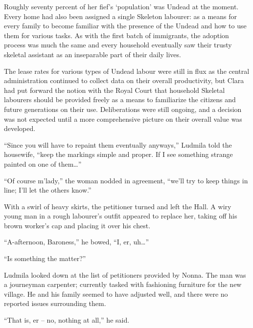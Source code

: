  

Roughly seventy percent of her fief’s ‘population’ was Undead at the moment. Every home had also been assigned a single Skeleton labourer: as a means for every family to become familiar with the presence of the Undead and how to use them for various tasks. As with the first batch of immigrants, the adoption process was much the same and every household eventually saw their trusty skeletal assistant as an inseparable part of their daily lives.

 

The lease rates for various types of Undead labour were still in flux as the central administration continued to collect data on their overall productivity, but Clara had put forward the notion with the Royal Court that household Skeletal labourers should be provided freely as a means to familiarize the citizens and future generations on their use. Deliberations were still ongoing, and a decision was not expected until a more comprehensive picture on their overall value was developed.

 

“Since you will have to repaint them eventually anyways,” Ludmila told the housewife, “keep the markings simple and proper. If I see something strange painted on one of them…”

 

“Of course m’lady,” the woman nodded in agreement, “we’ll try to keep things in line; I’ll let the others know.”

 

With a swirl of heavy skirts, the petitioner turned and left the Hall. A wiry young man in a rough labourer’s outfit appeared to replace her, taking off his brown worker’s cap and placing it over his chest.

 

“A-afternoon, Baroness,” he bowed, “I, er, uh…”

 

“Is something the matter?”

 

Ludmila looked down at the list of petitioners provided by Nonna. The man was a journeyman carpenter; currently tasked with fashioning furniture for the new village. He and his family seemed to have adjusted well, and there were no reported issues surrounding them.

 

“That is, er – no, nothing at all,” he said.

 


